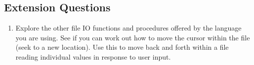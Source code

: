 
\subsection{Extension Questions} %
\label{sub:extension_questions}

\begin{enumerate}
  \item Explore the other file IO functions and procedures offered by the language you are using. See if you can work out how to move the cursor within the file (seek to a new location). Use this to move back and forth within a file reading individual values in response to user input. 
\end{enumerate}


